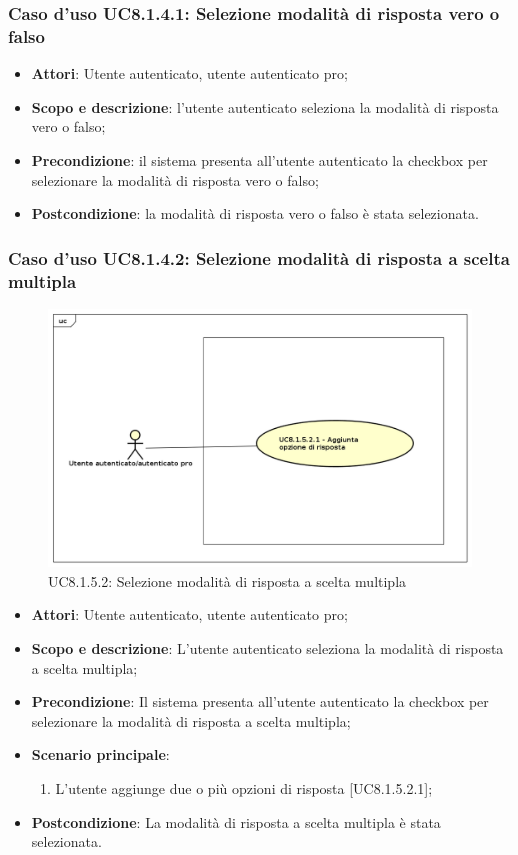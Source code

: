 	\subsubsection{Caso d'uso UC8.1.4.1: Selezione modalità di risposta vero o falso}
	\begin{itemize}
		\item
			\textbf{Attori}: Utente autenticato, utente autenticato pro;
		\item
			\textbf{Scopo e descrizione}: l'utente autenticato seleziona la modalità di risposta vero o falso;
		\item		
			\textbf{Precondizione}: il sistema presenta all'utente autenticato la checkbox per selezionare la modalità di risposta vero o falso;
		\item
			\textbf{Postcondizione}: la modalità di risposta vero o falso è stata selezionata.
	\end{itemize}
	\subsubsection{Caso d'uso UC8.1.4.2: Selezione modalità di risposta a scelta multipla}
	\label{UC8.1.5.2}
	\begin{figure}[h]
		\centering
			\includegraphics[scale=0.5,keepaspectratio]{UML/UC8_1_5_2.png}
		\caption{UC8.1.5.2: Selezione modalità di risposta a scelta multipla}
	\end{figure}
	\FloatBarrier	
	\begin{itemize}
		\item
			\textbf{Attori}: Utente autenticato, utente autenticato pro;
		\item
			\textbf{Scopo e descrizione}: L'utente autenticato seleziona la modalità di risposta a scelta multipla;
		\item		
			\textbf{Precondizione}: Il sistema presenta all'utente autenticato la checkbox per selezionare la modalità di risposta a scelta multipla;
		\item
			\textbf{Scenario principale}:
				\begin{enumerate}
					\item 	
						L'utente aggiunge due o più opzioni di risposta [UC8.1.5.2.1];	
				\end{enumerate}
		\item
			\textbf{Postcondizione}: La modalità di risposta a scelta multipla è stata selezionata.
	\end{itemize}

